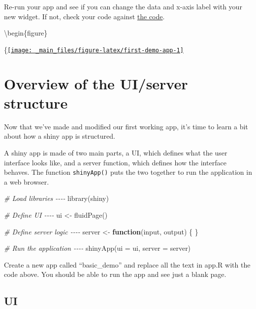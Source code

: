 \documentclass[
]{book}
\newenvironment{Shaded}{\begin{snugshade}}{\end{snugshade}}
\newcommand{\AttributeTok}[1]{\textcolor[rgb]{0.77,0.63,0.00}{#1}}
\newcommand{\CommentTok}[1]{\textcolor[rgb]{0.56,0.35,0.01}{\textit{#1}}}
\newcommand{\ControlFlowTok}[1]{\textcolor[rgb]{0.13,0.29,0.53}{\textbf{#1}}}
\newcommand{\FunctionTok}[1]{\textcolor[rgb]{0.00,0.00,0.00}{#1}}
\newcommand{\NormalTok}[1]{#1}
\newcommand{\OtherTok}[1]{\textcolor[rgb]{0.56,0.35,0.01}{#1}}
\begin{document}
Re-run your app and see if you can change the data and x-axis label with your new widget. If not, check your code against \href{https://shiny.psy.gla.ac.uk/debruine/first_demo/}{the code}.

\textbackslash begin\{figure\}

\{\centering \href{https://shiny.psy.gla.ac.uk/debruine/first_demo/}{\texttt{[image: \_main\_files/figure-latex/first-demo-app-1]} }

\hypertarget{overview-of-the-uiserver-structure}{%
\section{Overview of the UI/server structure}\label{overview-of-the-uiserver-structure}}

Now that we've made and modified our first working app, it's time to learn a bit about how a shiny app is structured.

A shiny app is made of two main parts, a UI, which defines what the user interface looks like, and a server function, which defines how the interface behaves. The function \texttt{shinyApp()} puts the two together to run the application in a web browser.

\begin{Shaded}
\begin{Highlighting}[]
\CommentTok{\# Load libraries {-}{-}{-}{-}}
\FunctionTok{library}\NormalTok{(shiny)}

\CommentTok{\# Define UI {-}{-}{-}{-}}
\NormalTok{ui }\OtherTok{\textless{}{-}} \FunctionTok{fluidPage}\NormalTok{()}

\CommentTok{\# Define server logic {-}{-}{-}{-}}
\NormalTok{server }\OtherTok{\textless{}{-}} \ControlFlowTok{function}\NormalTok{(input, output) \{}
\NormalTok{\}}

\CommentTok{\# Run the application {-}{-}{-}{-}}
\FunctionTok{shinyApp}\NormalTok{(}\AttributeTok{ui =}\NormalTok{ ui, }\AttributeTok{server =}\NormalTok{ server)}
\end{Highlighting}
\end{Shaded}

Create a new app called ``basic\_demo'' and replace all the text in app.R with the code above. You should be able to run the app and see just a blank page.

\hypertarget{ui}{%
\subsection{UI}\label{ui}}
\end{document}
